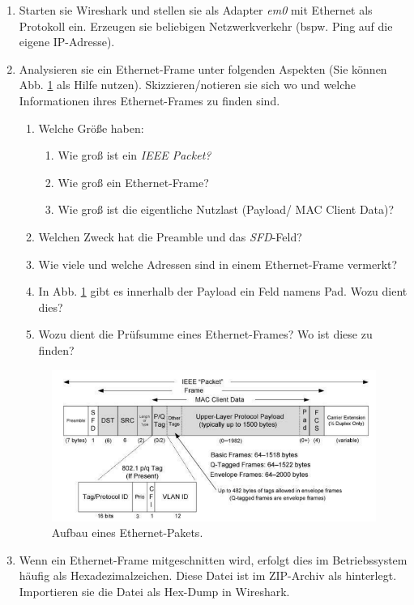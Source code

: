 \documentclass[paper=a4,fontsize=11pt]{scrartcl}%
\begin{document}
\begin{enumerate}
	\item Starten sie Wireshark und stellen sie als Adapter \emph{em0} mit Ethernet als Protokoll ein. Erzeugen sie beliebigen Netzwerkverkehr (bspw. Ping auf die eigene IP-Adresse).
	\item Analysieren sie ein Ethernet-Frame unter folgenden Aspekten (Sie können Abb. \ref{ehternet1} als Hilfe nutzen). Skizzieren/notieren sie sich wo und welche Informationen ihres Ethernet-Frames zu finden sind.
	\begin{enumerate}
		\item Welche Größe haben:
		\begin{enumerate}
			\item Wie groß ist ein \emph{IEEE Packet?}
			\item Wie groß ein Ethernet-Frame?
			\item Wie groß ist die eigentliche Nutzlast (Payload/ MAC Client Data)?
		\end{enumerate}
		\item Welchen Zweck hat die Preamble und das \emph{SFD}-Feld?
		\item Wie viele und welche Adressen sind in einem Ethernet-Frame vermerkt?
		\item In Abb. \ref{ehternet1} gibt es innerhalb der Payload ein Feld namens Pad. Wozu dient dies?
		\item Wozu dient die Prüfsumme eines Ethernet-Frames? Wo ist diese zu finden? 
	\end{enumerate}
	\begin{figure}[H]
		\centering
		\includegraphics[scale=0.5]{ethernet1}
		\caption{Aufbau eines Ethernet-Pakets.}
		\label{ehternet1}
		\end{figure}
		\item Wenn ein Ethernet-Frame mitgeschnitten wird, erfolgt dies im Betriebssystem häufig als Hexadezimalzeichen. Diese Datei ist im ZIP-Archiv als  hinterlegt. Importieren sie die Datei als Hex-Dump in Wireshark.

\end{enumerate}
\end{document}
